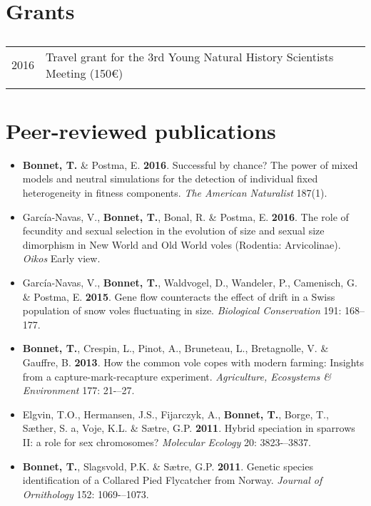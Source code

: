 \documentclass[a4paper,oneside,10pt]{article} %
\begin{document}
\section*{Grants}
\subsection*{}
\begin{tabular}{p{4cm}|p{11cm}}
\hfill \textsc{2016} & Travel grant for the 3rd Young Natural History Scientists Meeting (150\euro)\\
\multicolumn{2}{c}{} \\
\end{tabular}

\vspace{20pt}
\section*{Peer-reviewed publications}
\vspace{10pt}
\begin{itemize}
\item \textbf{Bonnet, T.} \& Postma, E. \textbf{2016}. Successful by chance? The power of mixed models and neutral simulations for the detection of individual fixed heterogeneity in fitness components. \textit{The American Naturalist} 187(1).
\item Garc\'{i}a-Navas, V., \textbf{Bonnet, T.}, Bonal, R. \& Postma, E. \textbf{2016}. The role of fecundity and sexual selection in the evolution of size and sexual size dimorphism in New World and Old World voles (Rodentia: Arvicolinae). \textit{Oikos} Early view.
\item Garc\'{i}a-Navas, V., \textbf{Bonnet, T.}, Waldvogel, D., Wandeler, P., Camenisch, G. \& Postma, E. \textbf{2015}. Gene flow counteracts the effect of drift in a Swiss population of snow voles fluctuating in size. \textit{Biological Conservation} 191: 168--177.
\item \textbf{Bonnet, T.}, Crespin, L., Pinot, A., Bruneteau, L., Bretagnolle, V. \& Gauffre, B. \textbf{2013}. How the common vole copes with modern farming: Insights from a capture-mark-recapture experiment. \textit{Agriculture, Ecosystems \& Environment} 177: 21-–27.
\item Elgvin, T.O., Hermansen, J.S., Fijarczyk, A., \textbf{Bonnet, T.}, Borge, T., S{\ae}ther, S. a, Voje, K.L. \& S{\ae}tre, G.P. \textbf{2011}. Hybrid speciation in sparrows II: a role for sex chromosomes? \textit{Molecular Ecology} 20: 3823-–3837.
\item \textbf{Bonnet, T.}, Slagsvold, P.K. \& S{\ae}tre, G.P. \textbf{2011}. Genetic species identification of a Collared Pied Flycatcher from Norway. \textit{Journal of Ornithology} 152: 1069-–1073.
\end{itemize}
\end{document}
